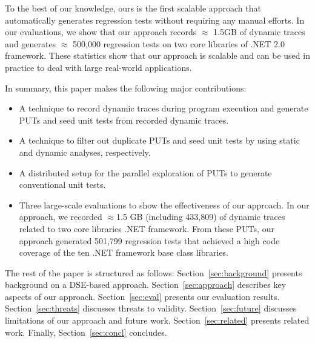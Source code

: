 To the best of our knowledge, ours is the first scalable
approach that automatically generates regression tests without 
requiring any manual efforts. In our evaluations, we show that our approach records 
$\approx$ 1.5GB of dynamic traces and generates $\approx$ 500,000 regression tests
on two core libraries of .NET 2.0 framework. These statistics show that our approach
is scalable and can be used in practice to deal with large real-world applications.

In summary, this paper makes the following major contributions:

\begin{itemize}
\item A technique to record dynamic traces during program execution and generate PUTs and seed
unit tests from recorded dynamic traces.
\item A technique to filter out duplicate PUTs and seed unit tests by 
using static and dynamic analyses, respectively.
\item A distributed setup for the parallel exploration of PUTs to generate conventional
unit tests.
\item Three large-scale evaluations to show the effectiveness of our approach. 
In our approach, we recorded $\approx$1.5 GB (including 433,809) of dynamic traces related
to two core libraries .NET framework. From these PUTs,
our approach generated 501,799 regression tests that achieved a
high code coverage of the ten .NET framework base class libraries. 
\end{itemize}

The rest of the paper is structured as follows:
Section~\ref{sec:background} presents background on a DSE-based approach.
Section~\ref{sec:approach} describes key aspects of our approach.
Section~\ref{sec:eval} presents our evaluation results.
Section~\ref{sec:threats} discusses threats to validity.
Section~\ref{sec:future} discusses limitations of our approach and future work.
Section~\ref{sec:related} presents related work.
Finally, Section~\ref{sec:concl} concludes. 





